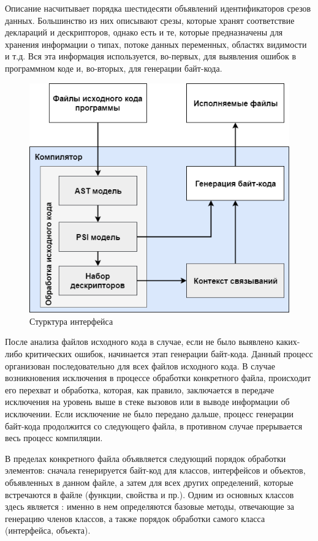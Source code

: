 Описание  насчитывает порядка шестидесяти объявлений идентификаторов срезов данных. Большинство из них описывают срезы, которые хранят соответствие деклараций и дескрипторов, однако есть и те, которые предназначены для хранения информации о типах, потоке данных переменных, областях видимости и т.д. Вся эта информация используется, во-первых, для выявления ошибок в программном коде и, во-вторых, для генерации байт-кода.

\begin{figure}[htbp]
    \centering
    \includegraphics[width=\textwidth]{resources/06/04_compiler_flow_diagram.png}
    \caption{Стурктура интерфейса }
    \label{fig05:binding-trace-scheme}
\end{figure}

После анализа файлов исходного кода в случае, если не было выявлено каких-либо критических ошибок, начинается этап генерации байт-кода. Данный процесс организован последовательно для всех файлов исходного кода. В случае возникновения исключения в процессе обработки конкретного файла, происходит его перехват и обработка, которая, как правило, заключается в передаче исключения на уровень выше в стеке вызовов или в выводе информации об исключении. Если исключение не было передано дальше, процесс генерации байт-кода продолжится со следующего файла, в противном случае прерывается весь процесс компиляции.  

В пределах конкретного файла объявляется следующий порядок обработки элементов: сначала генерируется байт-код для классов, интерфейсов и объектов, объявленных в данном файле, а затем для всех других определений, которые встречаются в файле (функции, свойства и пр.). Одним из основных классов здесь является : именно в нем определяются базовые методы, отвечающие за генерацию членов классов, а также порядок обработки самого класса (интерфейса, объекта). 

